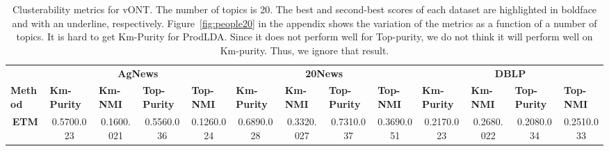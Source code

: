 \documentclass[11pt]{article}
\begin{document}
\begin{table*}[ ]
\caption{\label{tab:people20} Clusterability metrics for vONT. The number of topics is 20. The best and second-best scores of each dataset are highlighted in boldface and with an underline, respectively. Figure~\ref{fig:people20} in the appendix shows the variation of the metrics as a function of a number of topics. It is hard to get Km-Purity for ProdLDA. Since it does not perform well for Top-purity, we do not think it will perform well on Km-purity. Thus, we ignore that result.}

\scalebox{0.49} {
\centering
\begin{tabular}{c|cccc|cccc|cccc|}
\hline
\multicolumn{1}{r}{}\vline &
\multicolumn{4}{c}{\textbf{AgNews}}\vline  & \multicolumn{4}{c}{\textbf{20News}} \vline & \multicolumn{4}{c}{\textbf{DBLP}}\vline\\                                                                                                                                                                                                                       

\multicolumn{1}{l}{\textbf{Method}} \vline & \multicolumn{1}{l}{\textbf{Km-Purity}} & \multicolumn{1}{l}{\textbf{Km-NMI}} & \multicolumn{1}{l}{\textbf{Top-Purity}} & \multicolumn{1}{l}{\textbf{Top-NMI}} \vline& \multicolumn{1}{l}{\textbf{Km-Purity}} & \multicolumn{1}{l}{\textbf{Km-NMI}} & \multicolumn{1}{l}{\textbf{Top-Purity}} & \multicolumn{1}{l}{\textbf{Top-NMI}} \vline& \multicolumn{1}{l}{\textbf{Km-Purity}} & \multicolumn{1}{l}{\textbf{Km-NMI}} & \multicolumn{1}{l}{\textbf{Top-Purity}} & \multicolumn{1}{l}{\textbf{Top-NMI}} \vline\\
\hline
\textbf{ETM}                                               & 0.5700.023                                                    & 0.1600.021                                                 & 0.5560.036                                                     & 0.1260.024                                                  & 0.6890.028                                                    & 0.3320.027                                                 & 0.7310.037                                                     & 0.3690.051                                                  & 0.2170.023                                                    & 0.2680.022                                                 & 0.2080.034                                                     & 0.2510.033                                                  \\


\end{tabular}}
\end{table*}
\end{document}
